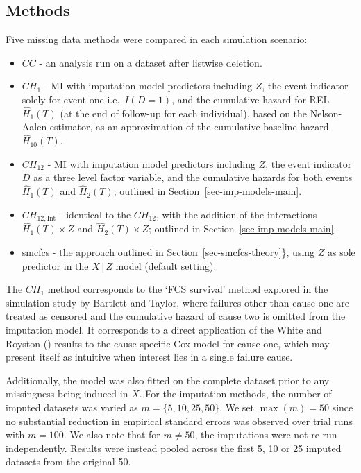 \documentclass[
  letterpaper,
  paper=240mm:170mm,
  twoside=true,
  open=right,
  fontsize=10pt,
  pagesize=false,
  BCOR=15mm,
  DIV=14,
  headinclude=true,
  footinclude=false,
  headsepline=on]{scrbook}
\newcommand{\given}{\,|\,}
\begin{document}
\subsection{Methods}\label{methods}

Five missing data methods were compared in each simulation scenario:

\begin{itemize}
\item
  \(CC\) - an analysis run on a dataset after listwise deletion.
\item
  \(CH_{1}\) - MI with imputation model predictors including \(Z\), the
  event indicator solely for event one i.e.~\(I(D = 1)\), and the
  cumulative hazard for REL \(\hat{H}_{1}(T)\) (at the end of follow-up
  for each individual), based on the Nelson-Aalen estimator, as an
  approximation of the cumulative baseline hazard \(\hat{H}_{10}(T)\).
\item
  \(CH_{12}\) - MI with imputation model predictors including \(Z\), the
  event indicator \(D\) as a three level factor variable, and the
  cumulative hazards for both events \(\hat{H}_{1}(T)\) and
  \(\hat{H}_{2}(T)\); outlined in Section~\ref{sec-imp-models-main}.
\item
  \(CH_{12,\text{Int}}\) - identical to the \(CH_{12}\), with the
  addition of the interactions \(\hat{H}_{1}(T) \times Z\) and
  \(\hat{H}_{2}(T) \times Z\); outlined in
  Section~\ref{sec-imp-models-main}.
\item
  smcfcs - the approach outlined in Section~\ref{sec-smcfcs-theory}\},
  using \(Z\) as sole predictor in the \(X \given Z\) model (default
  setting).
\end{itemize}

The \(CH_{1}\) method corresponds to the `FCS survival' method explored
in the simulation study by Bartlett and Taylor, where failures other
than cause one are treated as censored and the cumulative hazard of
cause two is omitted from the imputation model. It corresponds to a
direct application of the White and Royston
() results to the
cause-specific Cox model for cause one, which may present itself as
intuitive when interest lies in a single failure cause.

Additionally, the model was also fitted on the complete dataset prior to
any missingness being induced in \(X\). For the imputation methods, the
number of imputed datasets was varied as \(m = \{5, 10, 25, 50\}\). We
set \(\max(m) = 50\) since no substantial reduction in empirical
standard errors was observed over trial runs with \(m = 100\). We also
note that for \(m \neq 50\), the imputations were not re-run
independently. Results were instead pooled across the first 5, 10 or 25
imputed datasets from the original 50.
\end{document}
